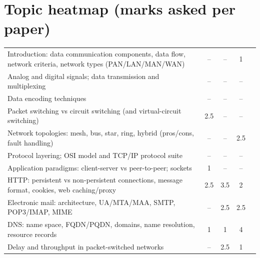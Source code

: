 \section{Topic heatmap (marks asked per paper)}
{\small\zebra
\begin{xltabular}{\linewidth}{Ycccc}
\toprule {} &  &  &  & \\\midrule\endhead
Introduction: data communication components, data flow, network criteria, network types (PAN/LAN/MAN/WAN) & \textcolor{muted}{--} & \textcolor{muted}{--} & 1 & \\
Analog and digital signals; data transmission and multiplexing & \textcolor{muted}{--} & \textcolor{muted}{--} & \textcolor{muted}{--} & \\
Data encoding techniques & \textcolor{muted}{--} & \textcolor{muted}{--} & \textcolor{muted}{--} & \\
Packet switching vs circuit switching (and virtual-circuit switching) & 2.5 & \textcolor{muted}{--} & \textcolor{muted}{--} & \\
Network topologies: mesh, bus, star, ring, hybrid (pros/cons, fault handling) & \textcolor{muted}{--} & \textcolor{muted}{--} & 2.5 & \\
Protocol layering; OSI model and TCP/IP protocol suite & \textcolor{muted}{--} & \textcolor{muted}{--} & \textcolor{muted}{--} & \\
Application paradigms: client-server vs peer-to-peer; sockets & 1 & \textcolor{muted}{--} & \textcolor{muted}{--} & \\
HTTP: persistent vs non-persistent connections, message format, cookies, web caching/proxy & 2.5 & 3.5 & 2 & \\
Electronic mail: architecture, UA/MTA/MAA, SMTP, POP3/IMAP, MIME & \textcolor{muted}{--} & 2.5 & 2.5 & \\
DNS: name space, FQDN/PQDN, domains, name resolution, resource records & 1 & 1 & 4 & \\
Delay and throughput in packet-switched networks & \textcolor{muted}{--} & 2.5 & 1 & \\

\end{xltabular}}
